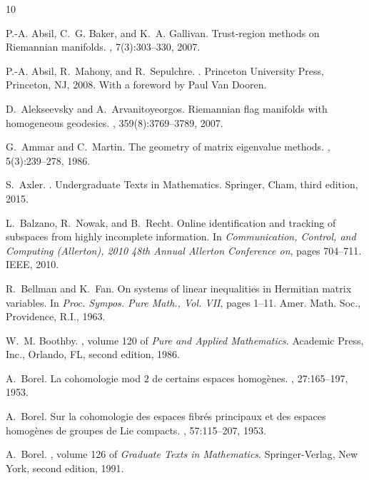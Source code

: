\documentclass[11pt,reqno]{amsart}%
\theoremstyle{definition}
\theoremstyle{remark}
\begin{document}

\begin{thebibliography}{10}

P.-A. Absil, C.~G. Baker, and K.~A. Gallivan.
\newblock Trust-region methods on {R}iemannian manifolds.
, 7(3):303--330, 2007.

P.-A. Absil, R.~Mahony, and R.~Sepulchre.
.
\newblock Princeton University Press, Princeton, NJ, 2008.
\newblock With a foreword by Paul Van Dooren.

D.~Alekseevsky and A.~Arvanitoyeorgos.
\newblock Riemannian flag manifolds with homogeneous geodesics.
, 359(8):3769--3789, 2007.

G.~Ammar and C.~Martin.
\newblock The geometry of matrix eigenvalue methods.
, 5(3):239--278, 1986.

S.~Axler.
.
\newblock Undergraduate Texts in Mathematics. Springer, Cham, third edition,
  2015.

L.~Balzano, R.~Nowak, and B.~Recht.
\newblock Online identification and tracking of subspaces from highly
  incomplete information.
\newblock In {\em Communication, Control, and Computing (Allerton), 2010 48th
  Annual Allerton Conference on}, pages 704--711. IEEE, 2010.

R.~Bellman and K.~Fan.
\newblock On systems of linear inequalities in {H}ermitian matrix variables.
\newblock In {\em Proc. {S}ympos. {P}ure {M}ath., {V}ol. {VII}}, pages 1--11.
  Amer. Math. Soc., Providence, R.I., 1963.

W.~M. Boothby.
, volume 120 of {\em Pure and Applied Mathematics}.
\newblock Academic Press, Inc., Orlando, FL, second edition, 1986.

A.~Borel.
\newblock La cohomologie mod {$2$} de certains espaces homog\`enes.
, 27:165--197, 1953.

A.~Borel.
\newblock Sur la cohomologie des espaces fibr\'{e}s principaux et des espaces
  homog\`enes de groupes de {L}ie compacts.
, 57:115--207, 1953.

A.~Borel.
, volume 126 of {\em Graduate Texts in
  Mathematics}.
\newblock Springer-Verlag, New York, second edition, 1991.


\end{thebibliography}
\end{document}
